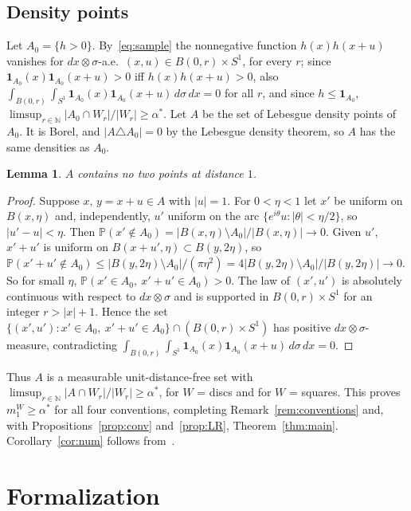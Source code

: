 \documentclass[11pt]{amsart}
\newtheorem{lemma}[theorem]{Lemma}
\theoremstyle{definition}
\theoremstyle{remark}
\newcommand{\N}{\mathbb{N}}
\renewcommand{\P}{\mathbb{P}}
\newcommand{\one}{\mathbf 1}
\begin{document}
\subsection{Density points}
Let $A_0=\{h>0\}$. By~\eqref{eq:sample} the nonnegative function $h(x)h(x+u)$ vanishes for $dx\otimes\sigma$-a.e.\ $(x,u)\in B(0,r)\times S^1$, for every $r$; since $\one_{A_0}(x)\one_{A_0}(x+u)>0$ iff $h(x)h(x+u)>0$, also $\int_{B(0,r)}\int_{S^1}\one_{A_0}(x)\one_{A_0}(x+u)\,d\sigma\,dx=0$ for all $r$, and since $h\le\one_{A_0}$, $\limsup_{r\in\N}|A_0\cap W_r|/|W_r|\ge\alpha^*$. Let $A$ be the set of Lebesgue density points of $A_0$. It is Borel, and $|A\triangle A_0|=0$ by the Lebesgue density theorem, so $A$ has the same densities as $A_0$.

\begin{lemma}\label{lem:dp}
$A$ contains no two points at distance $1$.
\end{lemma}

\begin{proof}
Suppose $x,\,y=x+u\in A$ with $|u|=1$. For $0<\eta<1$ let $x'$ be uniform on $B(x,\eta)$ and, independently, $u'$ uniform on the arc $\{e^{i\theta}u:|\theta|<\eta/2\}$, so $|u'-u|<\eta$. Then $\P(x'\notin A_0)=|B(x,\eta)\setminus A_0|/|B(x,\eta)|\to0$. Given $u'$, $x'+u'$ is uniform on $B(x+u',\eta)\subset B(y,2\eta)$, so $\P(x'+u'\notin A_0)\le|B(y,2\eta)\setminus A_0|/(\pi\eta^2)=4|B(y,2\eta)\setminus A_0|/|B(y,2\eta)|\to0$. So for small $\eta$, $\P(x'\in A_0,\ x'+u'\in A_0)>0$. The law of $(x',u')$ is absolutely continuous with respect to $dx\otimes\sigma$ and is supported in $B(0,r)\times S^1$ for an integer $r>|x|+1$. Hence the set $\{(x',u'):x'\in A_0,\ x'+u'\in A_0\}\cap(B(0,r)\times S^1)$ has positive $dx\otimes\sigma$-measure, contradicting $\int_{B(0,r)}\int_{S^1}\one_{A_0}(x)\one_{A_0}(x+u)\,d\sigma\,dx=0$.
\end{proof}

Thus $A$ is a measurable unit-distance-free set with $\limsup_{r\in\N}|A\cap W_r|/|W_r|\ge\alpha^*$, for $W$ = discs and for $W$ = squares. This proves $m_1^W\ge\alpha^*$ for all four conventions, completing Remark~\ref{rem:conventions} and, with Propositions~\ref{prop:conv} and~\ref{prop:LR}, Theorem~\ref{thm:main}. Corollary~\ref{cor:num} follows from~\cite{Croft,ACMVZ}.

\section{Formalization}\label{sec:lean}
\end{document}
